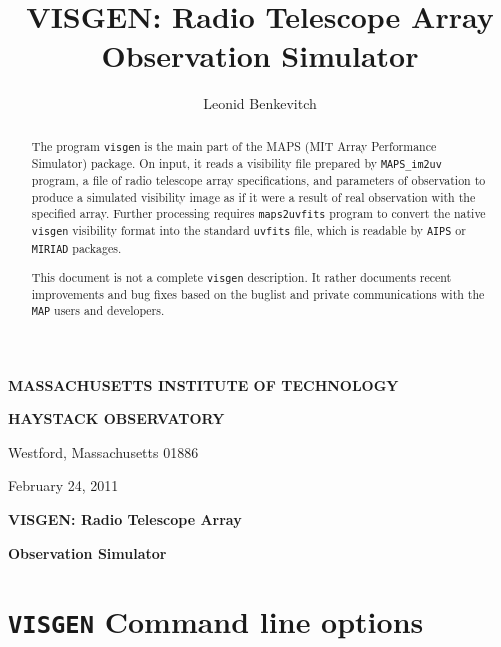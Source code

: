\documentclass[letterpaper, oneside, 11pt]{article}
\title{VISGEN: Radio Telescope Array Observation Simulator}
\author{Leonid Benkevitch}
\begin{document}
\centerline{\large\bf MASSACHUSETTS INSTITUTE OF TECHNOLOGY}
\centerline{\large\bf HAYSTACK OBSERVATORY}
\smallskip
\centerline{\normalsize Westford, Massachusetts 01886}
\bigskip
\centerline{February 24, 2011}
\bigskip
\bigskip
\bigskip
\centerline{\LARGE\bf VISGEN: Radio Telescope Array}
\centerline{\LARGE\bf Observation Simulator}


\begin{abstract}
The program {\tt visgen} is the main part of the MAPS (MIT Array Performance Simulator) package. On input, it reads a visibility file prepared by {\tt MAPS\_im2uv} program, a file of radio telescope array specifications, and parameters of observation to produce a simulated visibility image as if it were a result of real observation with the specified array. Further processing requires {\tt maps2uvfits} program to convert the native {\tt visgen} visibility format into the standard {\tt uvfits} file, which is readable by {\tt AIPS} or {\tt MIRIAD} packages. 

This document is not a complete {\tt visgen} description. It rather documents recent improvements and bug fixes based on the buglist and private communications with the {\tt MAP} users and developers. 
\end{abstract}

\section{{\tt VISGEN} Command line options}
\end{document}
